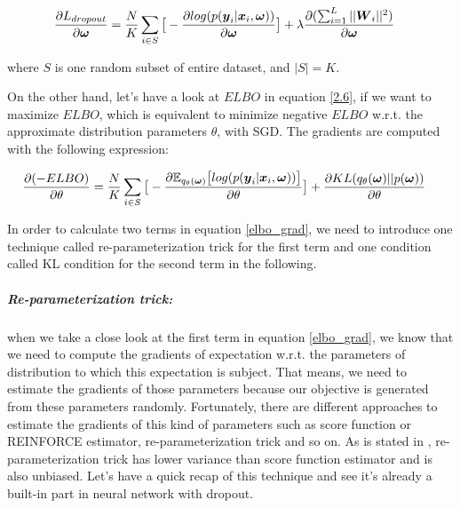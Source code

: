 \begin{equation}
\begin{aligned} \label{dropout_grad}
\frac{\partial L_{dropout}}{\partial \boldsymbol \omega} &=\frac{N}{K}\sum_{i \in S}\big[-\frac{\partial log(p(\boldsymbol y_{i}| \boldsymbol x_{i}, \boldsymbol \omega))}{\partial \boldsymbol \omega}\big] + \lambda\frac{\partial (\sum_{i=1}^{L} ||\boldsymbol W_{i}||^{2})}{\partial \boldsymbol \omega}
\end{aligned}
\end{equation}

where $S$ is one random subset of entire dataset, and $|S| = K$.

On the other hand, let's have a look at $ELBO$ in equation \ref{2.6}, if we want to maximize $ELBO$, which is equivalent to minimize negative $ELBO$ w.r.t. the approximate distribution parameters $\theta$, with SGD. The gradients are computed with the following expression:

\begin{equation}
\begin{aligned} \label{elbo_grad}
\frac{\partial (-ELBO)}{\partial \theta} &=\frac{N}{K}\sum_{i \in S}\big[-\frac{\partial \mathbb E_{q_{\theta}(\boldsymbol \omega)} \big[log(p(\boldsymbol y_{i}| \boldsymbol x_{i}, \boldsymbol \omega))\big]}{\partial \theta}\big] + \frac{\partial KL(q_{\theta}(\boldsymbol \omega)||p(\boldsymbol \omega))}{\partial \theta}
\end{aligned}
\end{equation}

In order to calculate two terms in equation \ref{elbo_grad}, we need to introduce one technique called re-parameterization trick\cite{kingma2013auto} for the first term and one condition called KL condition\cite{gal2016uncertainty} for the second term in the following.

\subparagraph{Re-parameterization trick:} when we take a close look at the first term in equation \ref{elbo_grad}, we know that we need to compute the gradients of expectation w.r.t. the parameters of distribution to which this expectation is subject. That means, we need to estimate the gradients of those parameters because our objective is generated from these parameters randomly. Fortunately, there are different approaches to estimate the gradients of this kind of parameters such as score function or REINFORCE estimator\cite{williams1992simple}, re-parameterization trick \cite{kingma2013auto} and so on. As is stated in \cite{kingma2013auto}, re-parameterization trick has lower variance than score function estimator and is also unbiased. Let's have a quick recap of this technique and see it's already a built-in part in neural network with dropout.

